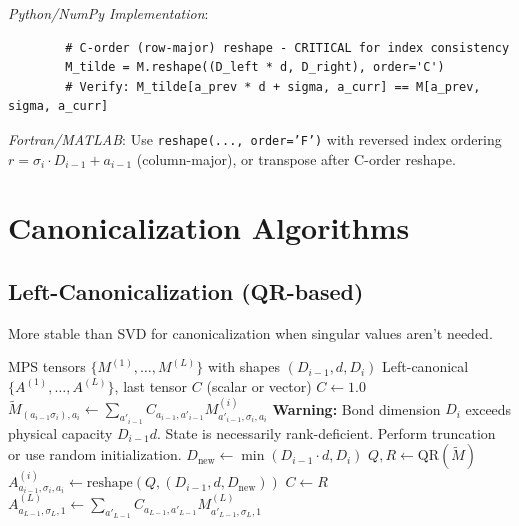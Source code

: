 \documentclass[aps,prb,onecolumn,scriptaddress]{revtex4-2}
\begin{document}
	\textit{Python/NumPy Implementation}:
	\begin{verbatim}
		# C-order (row-major) reshape - CRITICAL for index consistency
		M_tilde = M.reshape((D_left * d, D_right), order='C')
		# Verify: M_tilde[a_prev * d + sigma, a_curr] == M[a_prev, sigma, a_curr]
	\end{verbatim}
	\textit{Fortran/MATLAB}: Use \texttt{reshape(..., order='F')} with reversed index ordering $r = \sigma_i \cdot D_{i-1} + a_{i-1}$ (column-major), or transpose after C-order reshape.
	
	\section{Canonicalization Algorithms}
	
	\subsection{Left-Canonicalization (QR-based)}
	More stable than SVD for canonicalization when singular values aren't needed.
	
	\begin{algorithm}[H]
		\caption{LeftCanonicalize (Numerically Stable)}
		\begin{algorithmic}[1]
			\Require MPS tensors $\{M^{(1)}, \dots, M^{(L)}\}$ with shapes $(D_{i-1}, d, D_i)$
			\Ensure Left-canonical $\{A^{(1)}, \dots, A^{(L)}\}$, last tensor $C$ (scalar or vector)
			\State $C \gets 1.0$ 
			\State {}
			\State $\tilde{M}_{(a_{i-1}\sigma_i), a_i} \gets \sum_{a'_{i-1}} C_{a_{i-1}, a'_{i-1}} M^{(i)}_{a'_{i-1}, \sigma_i, a_i}$ 
			\State {}
			\State {}
			\State {}
			\State \textbf{Warning:} Bond dimension $D_i$ exceeds physical capacity $D_{i-1}d$. 
			\State {} State is necessarily rank-deficient. Perform truncation or use random initialization.
			\EndIf
			\State $D_{\text{new}} \gets \min(D_{i-1} \cdot d, D_i)$
			\State $Q, R \gets \text{QR}(\tilde{M})$ 
			\State $A^{(i)}_{a_{i-1}, \sigma_i, a_i} \gets \text{reshape}(Q, (D_{i-1}, d, D_{\text{new}}))$
			\State $C \gets R$ 
			\EndFor
			\State {}
			\State $A^{(L)}_{a_{L-1}, \sigma_L, 1} \gets \sum_{a'_{L-1}} C_{a_{L-1}, a'_{L-1}} M^{(L)}_{a'_{L-1}, \sigma_L, 1}$ 
		\end{algorithmic}
	\end{algorithm}
	
\end{document}
